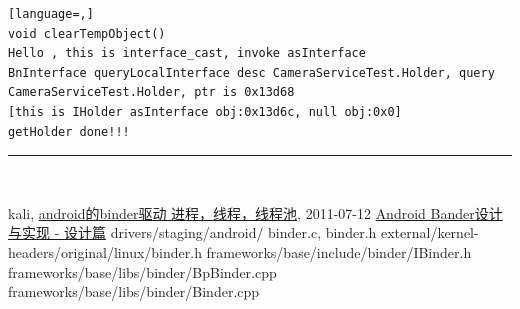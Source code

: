 \documentclass[a4paper,11pt]{article}
\begin{document}
\begin{appendices}
\begin{lstlisting}[language=,]
void clearTempObject()
Hello , this is interface_cast, invoke asInterface
BnInterface queryLocalInterface desc CameraServiceTest.Holder, query CameraServiceTest.Holder, ptr is 0x13d68
[this is IHolder asInterface obj:0x13d6c, null obj:0x0]
getHolder done!!!
\end{lstlisting}

\end{appendices}


\noindent\rule[-1ex]{\textwidth}{3pt}\\[2.0ex] 
\begin{thebibliography}{Binder}
     kali,
        \href{http://blog.sina.com.cn/s/blog_69f669470100s40o.html}{android的binder驱动 进程，线程，线程池},
        2011-07-12
        \bibitem {} \href{http://blog.csdn.net/universus/article/details/6211589}{Android Bander设计与实现 - 设计篇}
    drivers/staging/android/ binder.c, binder.h
    external/kernel-headers/original/linux/binder.h
    frameworks/base/include/binder/IBinder.h
    frameworks/base/libs/binder/BpBinder.cpp
    frameworks/base/libs/binder/Binder.cpp
\end{thebibliography}
\printindex

\end{document}
